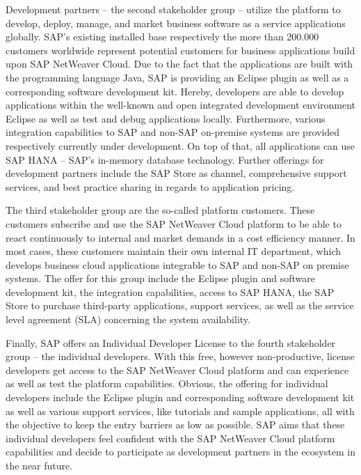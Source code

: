 Development partners -- the second stakeholder group -- utilize the platform to develop, deploy, manage, and market business software as a service applications globally. SAP's existing installed base respectively the more than 200.000 customers worldwide represent potential customers for business applications build upon SAP NetWeaver Cloud. Due to the fact that the applications are built with the programming language Java, SAP is providing an Eclipse plugin as well as a corresponding software development kit. Hereby, developers are able to develop applications within the well-known and open integrated development environment Eclipse as well as test and debug applications locally. Furthermore, various integration capabilities to SAP and non-SAP on-premise systems are provided respectively currently under development. On top of that, all applications can use SAP HANA -- SAP's in-memory database technology. Further offerings for development partners include the SAP Store as channel, comprehensive support services, and best practice sharing in regards to application pricing.

The third stakeholder group are the so-called platform customers. These customers subscribe and use the SAP NetWeaver Cloud platform to be able to react continuously to internal and market demands in a cost efficiency manner. In most cases, these customers maintain their own internal IT department, which develops business cloud applications integrable to SAP and non-SAP on premise systems. The offer for this group include the Eclipse plugin and software development kit, the integration capabilities, access to SAP HANA, the SAP Store to purchase third-party applications, support services, as well as the service level agreement (SLA) concerning the system availability.

Finally, SAP offers an Individual Developer License to the fourth stakeholder group -- the individual developers. With this free, however non-productive, license developers get access to the SAP NetWeaver Cloud platform and can experience as well as test the platform capabilities. Obvious, the offering for individual developers include the Eclipse plugin and corresponding software development kit as well as various support services, like tutorials and sample applications, all with the objective to keep the entry barriers as low as possible. SAP aims that these individual developers feel confident with the SAP NetWeaver Cloud platform capabilities and decide to participate as development partners in the ecosystem in the near future.

